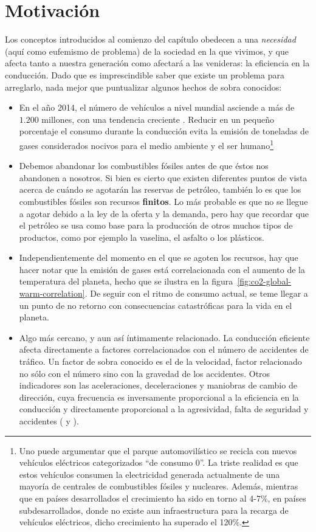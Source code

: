 \section{Motivación}

Los conceptos introducidos al comienzo del capítulo obedecen a una \textit{necesidad} (aquí como eufemismo de problema) de la sociedad en la que vivimos, y que afecta tanto a nuestra generación como afectará a las venideras: la eficiencia en la conducción. Dado que es imprescindible saber que existe un problema para arreglarlo, nada mejor que puntualizar algunos hechos de sobra conocidos:

\begin{itemize}
	\item En el año 2014, el número de vehículos a nivel mundial asciende a más de $1.200$ millones, con una tendencia creciente \cite{oica2014motrate}. Reducir en un pequeño porcentaje el consumo durante la conducción evita la emisión de toneladas de gases considerados nocivos para el medio ambiente y el ser humano\footnote{Uno puede argumentar que el parque automovilístico se recicla con nuevos vehículos eléctricos categorizados \enquote{de consumo 0}. La triste realidad es que estos vehículos consumen la electricidad generada actualmente de una mayoría de centrales de combustibles fósiles y nucleares. Además, mientras que en países desarrollados el crecimiento ha sido en torno al 4-7\%, en países subdesarrollados, donde no existe aun infraestructura para la recarga de vehículos eléctricos, dicho crecimiento ha superado el 120\%.}
	\item Debemos abandonar los combustibles fósiles antes de que éstos nos abandonen a nosotros. Si bien es cierto que existen diferentes puntos de vista acerca de cuándo se agotarán las reservas de petróleo, también lo es que los combustibles fósiles son recursos \textbf{finitos}. Lo más probable es que no se llegue a agotar debido a la ley de la oferta y la demanda, pero hay que recordar que el petróleo se usa como base para la producción de otros muchos tipos de productos, como por ejemplo la vaselina, el asfalto o los plásticos.
	\item Independientemente del momento en el que se agoten los recursos, hay que hacer notar que la emisión de gases está correlacionada con el aumento de la temperatura del planeta, hecho que se ilustra en la figura~\ref{fig:co2-global-warm-correlation}. De seguir con el ritmo de consumo actual, se teme llegar a un punto de no retorno con consecuencias catastróficas para la vida en el planeta.
	\item Algo más cercano, y aun así íntimamente relacionado. La conducción eficiente afecta directamente a factores correlacionados con el número de accidentes de tráfico. Un factor de sobra conocido es el de la velocidad, factor relacionado no sólo con el número sino con la gravedad de los accidentes\cite{imprialou2016re}. Otros indicadores son las aceleraciones, deceleraciones y maniobras de cambio de dirección, cuya frecuencia es inversamente proporcional a la eficiencia en la conducción y directamente proporcional a la agresividad, falta de seguridad y accidentes (\cite{dingus2006100} y \cite{lerner2010exploration}).
\end{itemize}

